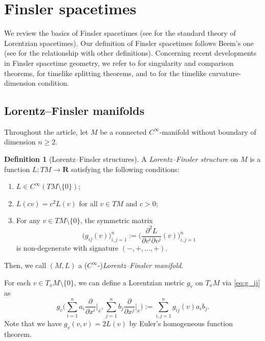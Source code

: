 \documentclass[a4paper,11pt]{article}
\numberwithin{equation}{section}
\theoremstyle{definition}
\newtheorem{definition}{Definition}[section]
\theoremstyle{plain}
\newcommand{\R}{\mathbf R}
\newcommand{\del}{\partial}
\newcommand{\lra}{\longrightarrow}
\begin{document}
\section{Finsler spacetimes}\label{sc:Fspt}%

We review the basics of Finsler spacetimes
(see \cite{ON, BEE} for the standard theory of Lorentzian spacetimes).
Our definition of Finsler spacetimes follows Beem's one \cite{Be} (see \cite[\S 2.1]{LMO1} for the relationship with other definitions).
Concerning recent developments in Finsler spacetime geometry,
we refer to \cite{LMO1,LMO2} for singularity and comparison theorems, \cite{LMO3, COO} for timelike splitting theorems, and to \cite{BO} for the timelike curvature-dimension condition.

\subsection{Lorentz--Finsler manifolds}%

Throughout the article, let $M$ be a connected $C^{\infty}$-manifold without boundary of dimension $n\ge 2$.

\begin{definition}[Lorentz--Finsler structures]\label{df:LFstr}
A \emph{Lorentz--Finsler structure} on $M$ is a function
$L\colon TM \lra \R$ satisfying the following conditions:
\begin{enumerate}[(1)]
\item $L \in C^{\infty}(TM \setminus \{0\})$;
\item $L(cv)=c^2 L(v)$ for all $v \in TM$ and $c>0$;
\item For any $v \in TM \setminus \{0\}$, the symmetric matrix
\begin{equation}\label{eq:g_ij}
\bigl( g_{ij}(v) \bigr)_{i,j=1}^n
 :=\biggl( \frac{\del^2 L}{\del v^i \del v^j}(v) \biggr)_{i,j=1}^n
\end{equation}
is non-degenerate with signature $(-,+,\ldots,+)$.
\end{enumerate}
Then, we call $(M,L)$ a ($C^{\infty}$-)\emph{Lorentz--Finsler manifold}.
\end{definition}

For each $v \in T_xM \setminus \{0\}$, we can define a Lorentzian metric $g_v$ on $T_xM$ via \eqref{eq:g_ij} as
\[ g_v \Biggl( \sum_{i=1}^n a_i \frac{\del}{\del x^i}\bigg|_x,
 \sum_{j=1}^n b_j \frac{\del}{\del x^j}\bigg|_x \Biggr)
 :=\sum_{i,j=1}^n g_{ij}(v) a_i b_j. \]
Note that we have $g_v(v,v)=2L(v)$ by Euler's homogeneous function theorem.
\end{document}
